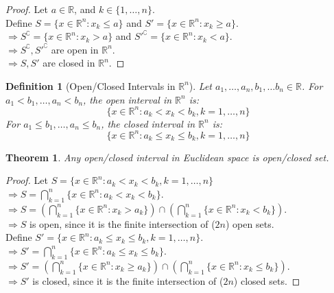 \documentclass{article}
\newtheorem{definition}{Definition}[section]
\newtheorem{theorem}{Theorem}[section]
\begin{document}
			\begin{proof} 
				Let $a \in \mathbb{R}$, and $k \in \{ 1, \ldots, n \}$.\\
				Define $S = \{ x \in \mathbb{R}^n: x_k \leq a \}$ and $S' = \{ x \in \mathbb{R}^n: x_k \geq a \}$.\\
				$\Rightarrow S^\complement = \{ x \in \mathbb{R}^n: x_k > a \}$ and $S'^\complement = \{ x \in \mathbb{R}^n: x_k < a \}$.\\
				$\Rightarrow S^\complement, S'^\complement$ are open in $\mathbb{R}^n$.\\
				$\Rightarrow S, S'$ are closed in  $\mathbb{R}^n$.
			\end{proof}
			
			\begin{definition}[Open/Closed Intervals in $\mathbb{R}^n$]
				\label{open closed intervals}
				Let $a_1, \ldots, a_n, b_1, \ldots b_n \in \mathbb{R}$.
				For $a_1 < b_1, \ldots, a_n < b_n$, the open interval in $\mathbb{R}^n$ is:
				$$ \{ x \in \mathbb{R}^n: a_k < x_k < b_k, k = 1, \ldots, n \}$$
				For $a_1 \leq b_1, \ldots, a_n \leq b_n$, the closed interval in $\mathbb{R}^n$ is:
				$$ \{ x \in \mathbb{R}^n: a_k \leq x_k \leq b_k, k = 1, \ldots, n \}$$
			\end{definition}

			\begin{theorem}
				Any open/closed interval in Euclidean space is open/closed set.
			\end{theorem}
			
			\begin{proof} 
				Let $S = \{ x \in \mathbb{R}^n: a_k < x_k < b_k, k = 1, \ldots, n \}$\\
				$\Rightarrow S = \bigcap_{k=1}^{n} \{ x \in \mathbb{R}^n: a_k < x_k < b_k \}$.\\
				$\Rightarrow S = (\bigcap_{k=1}^{n} \{ x \in \mathbb{R}^n: x_k > a_k \}) \cap (\bigcap_{k=1}^{n} \{ x \in \mathbb{R}^n: x_k < b_k \})$.\\
				$\Rightarrow S$ is open, since it is the finite intersection of ($2n$) open sets.\\
				Define $S' = \{ x \in \mathbb{R}^n: a_k \leq x_k \leq b_k, k = 1, \ldots, n \}$.\\
				$\Rightarrow S' = \bigcap_{k=1}^{n} \{ x \in \mathbb{R}^n: a_k \leq x_k \leq b_k \}$.\\
				$\Rightarrow S' = (\bigcap_{k=1}^{n} \{ x \in \mathbb{R}^n: x_k \geq a_k \}) \cap (\bigcap_{k=1}^{n} \{ x \in \mathbb{R}^n: x_k \leq b_k \})$.\\
				$\Rightarrow S'$ is closed, since it is the finite intersection of ($2n$) closed sets.
			\end{proof}
\end{document}
